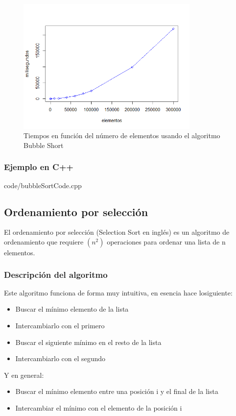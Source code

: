 \documentclass[8pt, A4]{article}    %
\newcommand{\grisclaro}{\color[gray]{0.99}}
\newcommand{\showprog}[1]
{
\begin{minipage}{\textwidth}

 {code/#1}
\end{minipage} 
}
\begin{document}
\begin{figure}[h]
\begin{center}
\includegraphics[width=0.8\textwidth]{graph/bubbleSortTime}
\end{center}
\caption{Tiempos en función del número de elementos usando el algoritmo Bubble Short}
\label{fig:bubbleSortTime}
\end{figure}

\subsubsection{Ejemplo en C++}

\showprog{bubbleSortCode.cpp}

\newpage


\subsection{Ordenamiento por selección}

El ordenamiento por selección (Selection Sort en inglés) es un algoritmo de ordenamiento que requiere ${\displaystyle (n^{2})}$ operaciones para ordenar una lista de n elementos.

\subsubsection{Descripción del algoritmo}
Este algoritmo funciona de forma muy intuitiva, en esencia hace losiguiente:

\begin{itemize}
	\item Buscar el mínimo elemento de la lista
    \item Intercambiarlo con el primero
    \item Buscar el siguiente mínimo en el resto de la lista
    \item Intercambiarlo con el segundo
\end{itemize}
Y en general:
\begin{itemize}
   \item  Buscar el mínimo elemento entre una posición i y el final de la lista
    \item Intercambiar el mínimo con el elemento de la posición i
\end{itemize}
\end{document}
